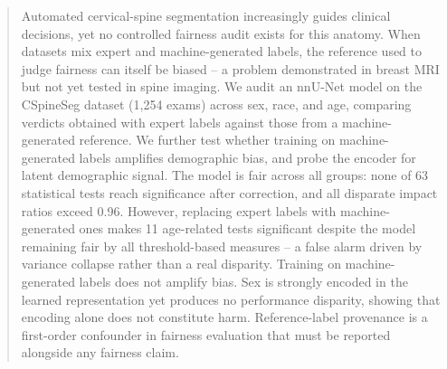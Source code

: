 \begin{abstract}

Automated cervical-spine segmentation increasingly guides clinical decisions, yet
no controlled fairness audit exists for this anatomy. When datasets mix expert and
machine-generated labels, the reference used to judge fairness can itself be
biased -- a problem demonstrated in breast MRI but not yet tested in spine
imaging. We audit an nnU-Net model on the CSpineSeg dataset (1,254 exams) across
sex, race, and age, comparing verdicts obtained with expert labels against those
from a machine-generated reference. We further test whether training on
machine-generated labels amplifies demographic bias, and probe the encoder for
latent demographic signal. The model is fair across all groups: none of 63
statistical tests reach significance after correction, and all disparate impact
ratios exceed 0.96. However, replacing expert labels with machine-generated ones makes 11 age-related
tests significant despite the model remaining fair by all threshold-based
measures -- a false alarm driven by variance collapse rather than a real
disparity. Training
on machine-generated labels does not amplify bias. Sex is strongly encoded in the
learned representation yet produces no performance disparity, showing that
encoding alone does not constitute harm. Reference-label provenance is a
first-order confounder in fairness evaluation that must be reported alongside any
fairness claim.

\end{abstract}
